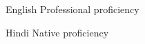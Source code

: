 
\begin{cvlanguages}

  \cvlanguage
    {English} %
    {Professional proficiency} %

  \cvlanguage
    {Hindi} %
    {Native proficiency} %

\end{cvlanguages}
